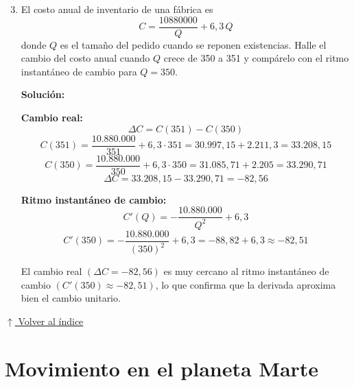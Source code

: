 \documentclass[12pt]{article}
\newcommand{\solucion}{%
    \vspace{0.8em}%
    \textbf{Solución:}%
}
\newcommand{\volverindice}{%
    \vspace{1em}%
    \begin{flushright}%
        \hyperlink{indice}{\small $\uparrow$ Volver al índice}%
    \end{flushright}%
}
\begin{document}
\begin{enumerate}[label=\alph*.-]
    \setcounter{enumi}{2} %
    \item El costo anual de inventario de una fábrica es
    \[
    C = \frac{10880000}{Q} + 6{,}3\,Q
    \]
    donde $Q$ es el tamaño del pedido cuando se reponen existencias.
    Halle el cambio del costo anual cuando $Q$ crece de 350 a 351 y compárelo con el ritmo instantáneo de cambio para $Q = 350$.

    \solucion

    \textbf{Cambio real:}
    \[
    \Delta C = C(351) - C(350)
    \]
    \[
    C(351) = \frac{10{.}880{.}000}{351} + 6{,}3 \cdot 351 = 30{.}997{,}15 + 2{.}211{,}3 = 33{.}208{,}15
    \]
    \[
    C(350) = \frac{10{.}880{.}000}{350} + 6{,}3 \cdot 350 = 31{.}085{,}71 + 2{.}205 = 33{.}290{,}71
    \]
    \[
    \Delta C = 33{.}208{,}15 - 33{.}290{,}71 = -82{,}56
    \]

    \textbf{Ritmo instantáneo de cambio:}
    \[
    C'(Q) = -\frac{10{.}880{.}000}{Q^2} + 6{,}3
    \]
    \[
    C'(350) = -\frac{10{.}880{.}000}{(350)^2} + 6{,}3 = -88{,}82 + 6{,}3 \approx -82{,}51
    \]

    El cambio real $(\Delta C = -82{,}56)$ es muy cercano al ritmo instantáneo de cambio $(C'(350) \approx -82{,}51)$, lo que confirma que la derivada aproxima bien el cambio unitario.
    \end{enumerate}

\volverindice
\newpage

\section{Movimiento en el planeta Marte}
\end{document}
